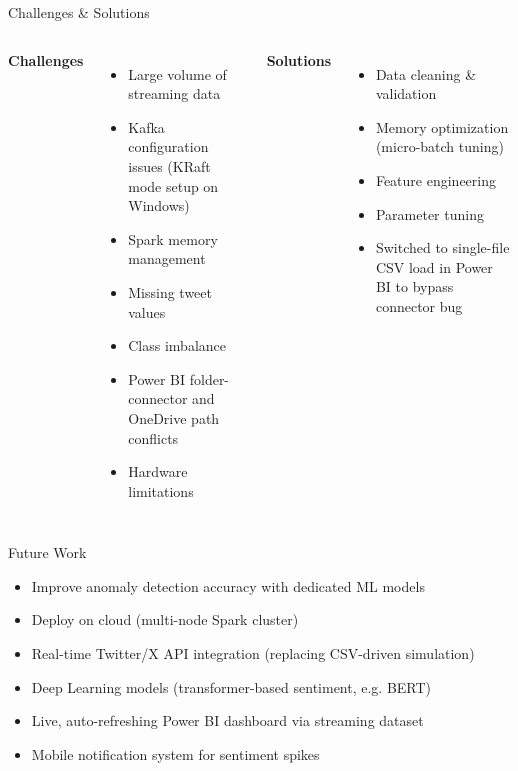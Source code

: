 \documentclass[aspectratio=169]{beamer}
\begin{document}
\begin{frame}{Challenges \& Solutions}
\begin{columns}
\textbf{Challenges}
\begin{itemize}
    \item Large volume of streaming data
    \item Kafka configuration issues (KRaft mode setup on Windows)
    \item Spark memory management
    \item Missing tweet values
    \item Class imbalance
    \item Power BI folder-connector and OneDrive path conflicts
    \item Hardware limitations
\end{itemize}
\textbf{Solutions}
\begin{itemize}
    \item Data cleaning \& validation
    \item Memory optimization (micro-batch tuning)
    \item Feature engineering
    \item Parameter tuning
    \item Switched to single-file CSV load in Power BI to bypass connector bug
\end{itemize}
\end{columns}
\end{frame}

\begin{frame}{Future Work}
\begin{itemize}
    \item Improve anomaly detection accuracy with dedicated ML models
    \item Deploy on cloud (multi-node Spark cluster)
    \item Real-time Twitter/X API integration (replacing CSV-driven simulation)
    \item Deep Learning models (transformer-based sentiment, e.g. BERT)
    \item Live, auto-refreshing Power BI dashboard via streaming dataset
    \item Mobile notification system for sentiment spikes
\end{itemize}
\end{frame}
\end{document}
